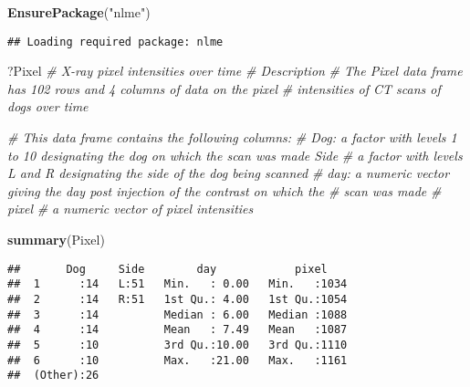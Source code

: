 \documentclass[]{article}
\newenvironment{Shaded}{\begin{snugshade}}{\end{snugshade}}
\newcommand{\CommentTok}[1]{\textcolor[rgb]{0.56,0.35,0.01}{\textit{#1}}}
\newcommand{\KeywordTok}[1]{\textcolor[rgb]{0.13,0.29,0.53}{\textbf{#1}}}
\newcommand{\NormalTok}[1]{#1}
\newcommand{\OperatorTok}[1]{\textcolor[rgb]{0.81,0.36,0.00}{\textbf{#1}}}
\newcommand{\StringTok}[1]{\textcolor[rgb]{0.31,0.60,0.02}{#1}}
\begin{document}
\begin{Shaded}
\begin{Highlighting}[]
\KeywordTok{EnsurePackage}\NormalTok{(}\StringTok{"nlme"}\NormalTok{)}
\end{Highlighting}
\end{Shaded}

\begin{verbatim}
## Loading required package: nlme
\end{verbatim}

\begin{Shaded}
\begin{Highlighting}[]
\NormalTok{?Pixel}
\CommentTok{# X-ray pixel intensities over time}
\CommentTok{# Description}
\CommentTok{# The Pixel data frame has 102 rows and 4 columns of data on the pixel }
\CommentTok{# intensities of CT scans of dogs over time}

\CommentTok{# This data frame contains the following columns:}
\CommentTok{# Dog: a factor with levels 1 to 10 designating the dog on which the scan was made Side}
\CommentTok{# a factor with levels L and R designating the side of the dog being scanned}
\CommentTok{# day: a numeric vector giving the day post injection of the contrast on which the }
\CommentTok{# scan was made}
\CommentTok{# pixel}
\CommentTok{# a numeric vector of pixel intensities}

\KeywordTok{summary}\NormalTok{(Pixel)}
\end{Highlighting}
\end{Shaded}

\begin{verbatim}
##       Dog     Side        day            pixel     
##  1      :14   L:51   Min.   : 0.00   Min.   :1034  
##  2      :14   R:51   1st Qu.: 4.00   1st Qu.:1054  
##  3      :14          Median : 6.00   Median :1088  
##  4      :14          Mean   : 7.49   Mean   :1087  
##  5      :10          3rd Qu.:10.00   3rd Qu.:1110  
##  6      :10          Max.   :21.00   Max.   :1161  
##  (Other):26
\end{verbatim}

\begin{Shaded}
\end{Shaded}
\end{document}
